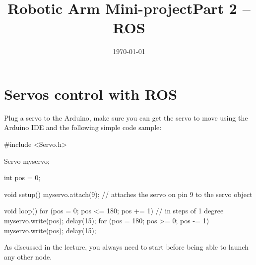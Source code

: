 \documentclass{instructions}
\title{Robotic Arm Mini-project\newline Part 2 -- ROS}
\date{\today}
\begin{document}
\maketitle




\pagebreak

\intro



\part{Servos control with ROS}


Plug a servo to the Arduino, make sure you can get the servo to move using the
Arduino IDE and the following simple code sample:

\begin{cppcode}
#include <Servo.h>

Servo myservo;

int pos = 0;

void setup() {
  myservo.attach(9);  // attaches the servo on pin 9 to the servo object
}

void loop() {
  for (pos = 0; pos <= 180; pos += 1) {
    // in steps of 1 degree
    myservo.write(pos);
    delay(15);
  }
  for (pos = 180; pos >= 0; pos -= 1) {
    myservo.write(pos);
    delay(15);
  }
}
\end{cppcode}


As discussed in the lecture, you always need to start  before being able to launch any other node.
\end{document}
